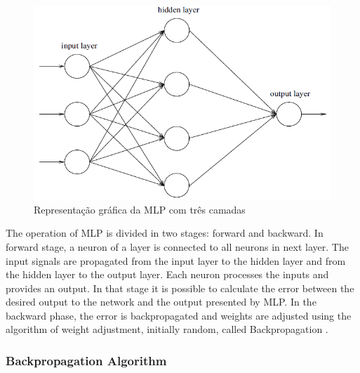 \begin{figure}[h]
	\centering
	\includegraphics[width=.6\textwidth]{image/mlp2.png}
	\caption{Representação gráfica da MLP com três camadas}
	\label{fig:mlp2}
\end{figure}

The operation of MLP is divided in two stages: forward and backward. In forward stage, a neuron of a layer is connected to all neurons in next layer. The input signals are propagated from the input layer to the hidden layer and from the hidden layer to the output layer. Each neuron processes the inputs and provides an output. In that stage it is possible to calculate the error between the desired output to the network and the output presented by MLP. In the backward phase, the error is backpropagated and weights are adjusted using the algorithm of weight adjustment, initially random, called Backpropagation \cite{valenca2005aplicando}.

\subsubsection{Backpropagation Algorithm}

